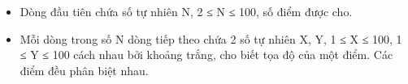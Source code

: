 \begin{itemize}
	\item     Dòng đầu tiên chứa số tự nhiên N, 2 ≤ N ≤ 100, số điểm được cho.   
	\item     Mỗi dòng trong số N dòng tiếp theo chứa 2 số tự nhiên X, Y, 1 ≤ X ≤ 100, 1 ≤ Y ≤ 100 cách nhau bởi khoảng trắng, cho biết tọa độ của một điểm. Các điểm đều phân biệt nhau.   
\end{itemize}